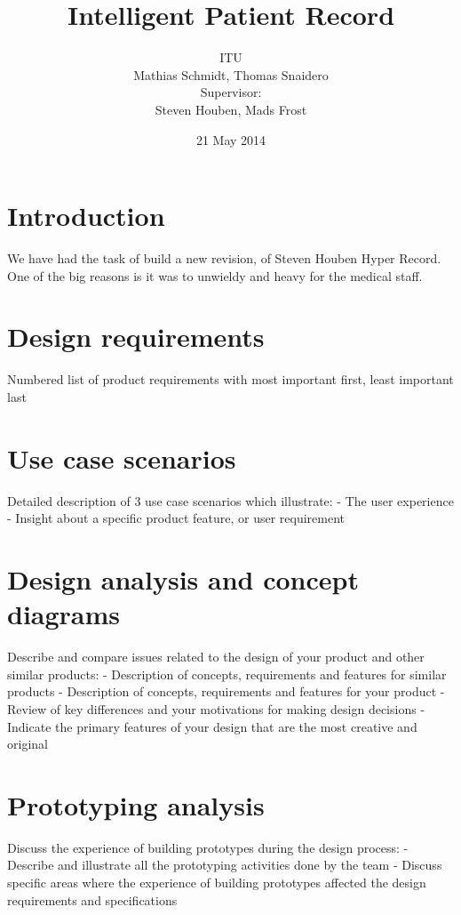 \documentclass{article}
\title{Intelligent Patient Record}
\author{ITU \\
Mathias Schmidt, Thomas Snaidero \\
Supervisor: \\
Steven Houben, Mads Frost}
\date{21 May 2014}
\begin{document}
\maketitle

\pagebreak

\tableofcontents

\pagebreak


\section{Introduction}
We have had the task of build a new revision, of Steven Houben Hyper Record.
One of the big reasons is it was to unwieldy and heavy for the medical staff.


\section{Design requirements}
Numbered list of product requirements with most important first, least important last


\section{Use case scenarios}
Detailed description of 3 use case scenarios which illustrate:
- The user experience
- Insight about a specific product feature, or user requirement


\section{Design analysis and concept diagrams}
Describe and compare issues related to the design of your product and other similar products:
- Description of concepts, requirements and features for similar products
- Description of concepts, requirements and features for your product
- Review of key differences and your motivations for making design decisions
- Indicate the primary features of your design that are the most creative and original

\section{Prototyping analysis}
Discuss the experience of building prototypes during the design process:
- Describe and illustrate all the prototyping activities done by the team
- Discuss specific areas where the experience of building prototypes affected the design requirements and specifications
\end{document}
